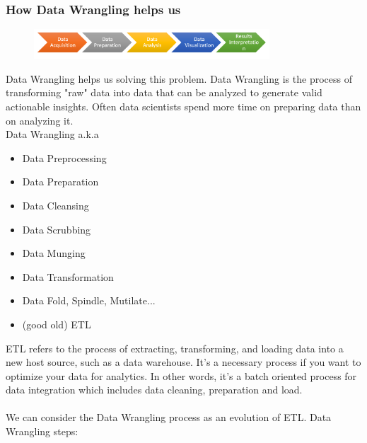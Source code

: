 \documentclass[10pt,a4paper]{article}
\newcommand{\nline}{\\~\\}
\begin{document}
\subsubsection{How Data Wrangling helps us}
\begin{figure}[ht!]
 \hfill \includegraphics[width=250pt]{images/data-wrangling-is}
 \hspace*{\fill}
 \end{figure} 
 Data Wrangling helps us solving this problem. Data Wrangling is the process of transforming "raw" data into data that can be analyzed to generate valid actionable insights. Often data scientists spend more time on preparing data than on analyzing it. \\
 Data Wrangling a.k.a
 \begin{itemize}
 	\item Data Preprocessing
	\item Data Preparation
	\item Data Cleansing
	\item Data Scrubbing
	\item Data Munging
	\item Data Transformation
	\item Data Fold, Spindle, Mutilate...
	\item (good old) ETL
 \end{itemize}
ETL refers to the process of extracting, transforming, and loading data into a new host source, such as a data warehouse. It’s a necessary process if you want to optimize your data for analytics. In other words, it's a batch oriented process for data integration which includes data cleaning, preparation and load.
\nline
We can consider the Data Wrangling process as an evolution of ETL.
Data Wrangling steps:
\end{document}
